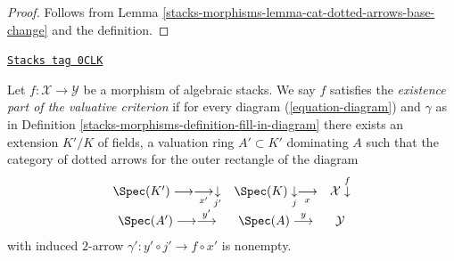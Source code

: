\begin{proof}
Follows from Lemma \ref{stacks-morphisms-lemma-cat-dotted-arrows-base-change}
and the definition.
\end{proof}

\begin{definition}[Existence]
\label{stacks-morphisms-definition-existence}
\href{https://stacks.math.columbia.edu/tag/0CLK}{\texttt{Stacks tag 0CLK}}

Let $f : \mathcal{X} \to \mathcal{Y}$ be a morphism of algebraic stacks.
We say $f$ satisfies the {\it existence part of the valuative criterion}
if for every diagram (\ref{equation-diagram}) and $\gamma$
as in Definition \ref{stacks-morphisms-definition-fill-in-diagram}
there exists an extension $K'/K$ of fields, a valuation ring $A' \subset K'$
dominating $A$ such that the category of dotted arrows for the
outer rectangle of the diagram
$$
\begin{array}{ccc}\Spec(K') \longrightarrow\underset{x'}{\longrightarrow}\underset{j'}{\downarrow} & \Spec(K) \underset{j}{\downarrow}\underset{x}{\longrightarrow} & \mathcal{X} \overset{f}{\downarrow} \\ \Spec(A') \longrightarrow\overset{y'}{\longrightarrow} & \Spec(A) \overset{y}{\longrightarrow} & \mathcal{Y}\end{array}
$$
with induced $2$-arrow $\gamma' : y' \circ j' \to f \circ x'$ is nonempty.
\end{definition}

